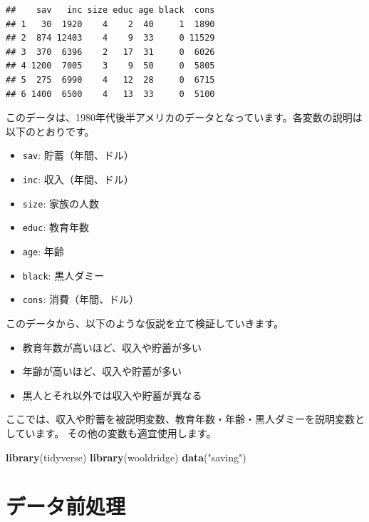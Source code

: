 \documentclass[]{book}
\newenvironment{Shaded}{\begin{snugshade}}{\end{snugshade}}
\newcommand{\KeywordTok}[1]{\textcolor[rgb]{0.13,0.29,0.53}{\textbf{#1}}}
\newcommand{\StringTok}[1]{\textcolor[rgb]{0.31,0.60,0.02}{#1}}
\newcommand{\NormalTok}[1]{#1}
\providecommand{\tightlist}{%
  \setlength{\itemsep}{0pt}\setlength{\parskip}{0pt}}
\begin{document}
\begin{verbatim}
##    sav   inc size educ age black  cons
## 1   30  1920    4    2  40     1  1890
## 2  874 12403    4    9  33     0 11529
## 3  370  6396    2   17  31     0  6026
## 4 1200  7005    3    9  50     0  5805
## 5  275  6990    4   12  28     0  6715
## 6 1400  6500    4   13  33     0  5100
\end{verbatim}

このデータは、1980年代後半アメリカのデータとなっています。各変数の説明は以下のとおりです。

\begin{itemize}
\tightlist
\item
  \texttt{sav}: 貯蓄（年間、ドル）
\item
  \texttt{inc}: 収入（年間、ドル）
\item
  \texttt{size}: 家族の人数
\item
  \texttt{educ}: 教育年数
\item
  \texttt{age}: 年齢
\item
  \texttt{black}: 黒人ダミー
\item
  \texttt{cons}: 消費（年間、ドル）
\end{itemize}

このデータから、以下のような仮説を立て検証していきます。

\begin{itemize}
\tightlist
\item
  教育年数が高いほど、収入や貯蓄が多い
\item
  年齢が高いほど、収入や貯蓄が多い
\item
  黒人とそれ以外では収入や貯蓄が異なる
\end{itemize}

ここでは、収入や貯蓄を被説明変数、教育年数・年齢・黒人ダミーを説明変数としています。
その他の変数も適宜使用します。

\begin{Shaded}
\begin{Highlighting}[]
\KeywordTok{library}\NormalTok{(tidyverse)}
\KeywordTok{library}\NormalTok{(wooldridge)}
\KeywordTok{data}\NormalTok{(}\StringTok{"saving"}\NormalTok{)}
\end{Highlighting}
\end{Shaded}

\chapter{データ前処理}\label{DataHandling}
\end{document}
